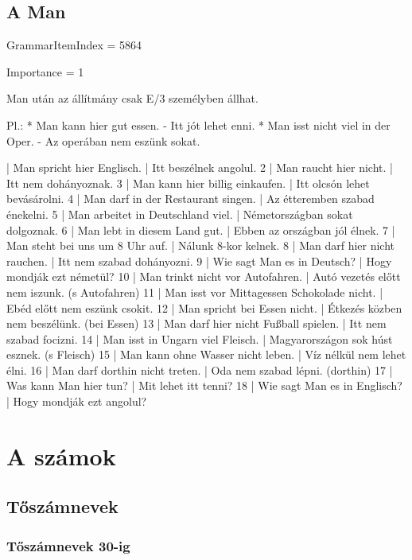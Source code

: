 \documentclass{article}
\newenvironment{desc}{\verbatim}{\endverbatim}
\newenvironment{exmp}{\verbatim}{\endverbatim}
\begin{document}
\subsection{A Man}

GrammarItemIndex = 5864

Importance = 1

\begin{desc}
Man után az állítmány csak E/3 személyben állhat.

Pl.: * Man kann hier gut essen. - Itt jót lehet enni.
* Man isst nicht viel in der Oper. - Az operában nem eszünk sokat. 
\end{desc}

\begin{exmp}
1 | Man spricht hier Englisch. | Itt beszélnek angolul.
2 | Man raucht hier nicht. | Itt nem dohányoznak.
3 | Man kann hier billig einkaufen. | Itt olcsón lehet bevásárolni.
4 | Man darf in der Restaurant singen. | Az étteremben szabad énekelni.
5 | Man arbeitet in Deutschland viel. | Németországban sokat dolgoznak.
6 | Man lebt in diesem Land gut. | Ebben az országban jól élnek.
7 | Man steht bei uns um 8 Uhr auf. | Nálunk 8-kor kelnek.
8 | Man darf hier nicht rauchen. | Itt nem szabad dohányozni.
9 | Wie sagt Man es in Deutsch? | Hogy mondják ezt németül?
10 | Man trinkt nicht vor Autofahren. | Autó vezetés előtt nem iszunk. (s Autofahren)
11 | Man isst vor Mittagessen Schokolade nicht. | Ebéd előtt nem eszünk csokit.
12 | Man spricht bei Essen nicht. | Étkezés közben nem beszélünk. (bei Essen)
13 | Man darf hier nicht Fußball spielen. | Itt nem szabad focizni.
14 | Man isst in Ungarn viel Fleisch. | Magyarországon sok húst esznek. (s Fleisch)
15 | Man kann ohne Wasser nicht leben. | Víz nélkül nem lehet élni.
16 | Man darf dorthin nicht treten. | Oda nem szabad lépni. (dorthin)
17 | Was kann Man hier tun? | Mit lehet itt tenni?
18 | Wie sagt Man es in Englisch? | Hogy mondják ezt angolul?
\end{exmp}

\section{A számok}

\subsection{Tőszámnevek}

\subsubsection{Tőszámnevek 30-ig}
\end{document}

